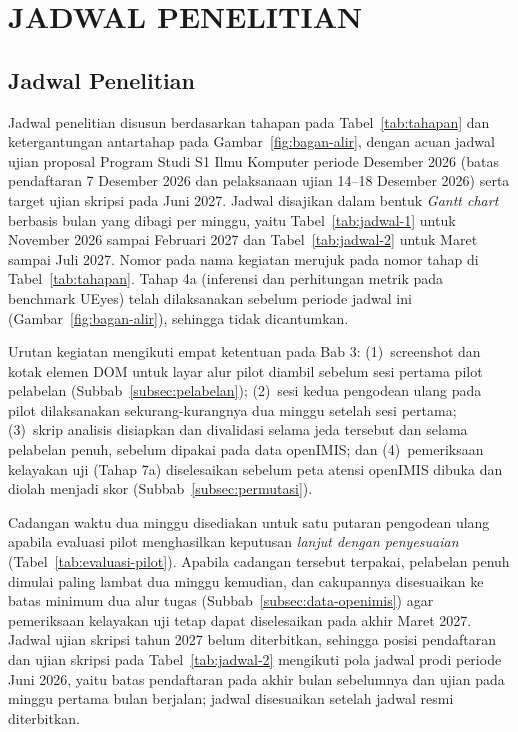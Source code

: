 \newcommand{\gantt}{\cellcolor{ganttisi}}
\newcommand{\ganttcadangan}{\cellcolor{ganttcadangan}}

\chapter{JADWAL PENELITIAN}
\label{chap:jadwal}

\section{Jadwal Penelitian}
\label{sec:jadwal}

Jadwal penelitian disusun berdasarkan tahapan pada Tabel~\ref{tab:tahapan} dan ketergantungan antartahap pada Gambar~\ref{fig:bagan-alir}, dengan acuan jadwal ujian proposal Program Studi S1 Ilmu Komputer periode Desember 2026 (batas pendaftaran 7 Desember 2026 dan pelaksanaan ujian 14--18 Desember 2026) serta target ujian skripsi pada Juni 2027. Jadwal disajikan dalam bentuk \emph{Gantt chart} berbasis bulan yang dibagi per minggu, yaitu Tabel~\ref{tab:jadwal-1} untuk November 2026 sampai Februari 2027 dan Tabel~\ref{tab:jadwal-2} untuk Maret sampai Juli 2027. Nomor pada nama kegiatan merujuk pada nomor tahap di Tabel~\ref{tab:tahapan}. Tahap 4a (inferensi dan perhitungan metrik pada benchmark UEyes) telah dilaksanakan sebelum periode jadwal ini (Gambar~\ref{fig:bagan-alir}), sehingga tidak dicantumkan.

Urutan kegiatan mengikuti empat ketentuan pada Bab 3: (1)~screenshot dan kotak elemen DOM untuk layar alur pilot diambil sebelum sesi pertama pilot pelabelan (Subbab~\ref{subsec:pelabelan}); (2)~sesi kedua pengodean ulang pada pilot dilaksanakan sekurang-kurangnya dua minggu setelah sesi pertama; (3)~skrip analisis disiapkan dan divalidasi selama jeda tersebut dan selama pelabelan penuh, sebelum dipakai pada data openIMIS; dan (4)~pemeriksaan kelayakan uji (Tahap 7a) diselesaikan sebelum peta atensi openIMIS dibuka dan diolah menjadi skor (Subbab~\ref{subsec:permutasi}).

Cadangan waktu dua minggu disediakan untuk satu putaran pengodean ulang apabila evaluasi pilot menghasilkan keputusan \emph{lanjut dengan penyesuaian} (Tabel~\ref{tab:evaluasi-pilot}). Apabila cadangan tersebut terpakai, pelabelan penuh dimulai paling lambat dua minggu kemudian, dan cakupannya disesuaikan ke batas minimum dua alur tugas (Subbab~\ref{subsec:data-openimis}) agar pemeriksaan kelayakan uji tetap dapat diselesaikan pada akhir Maret 2027. Jadwal ujian skripsi tahun 2027 belum diterbitkan, sehingga posisi pendaftaran dan ujian skripsi pada Tabel~\ref{tab:jadwal-2} mengikuti pola jadwal prodi periode Juni 2026, yaitu batas pendaftaran pada akhir bulan sebelumnya dan ujian pada minggu pertama bulan berjalan; jadwal disesuaikan setelah jadwal resmi diterbitkan.

